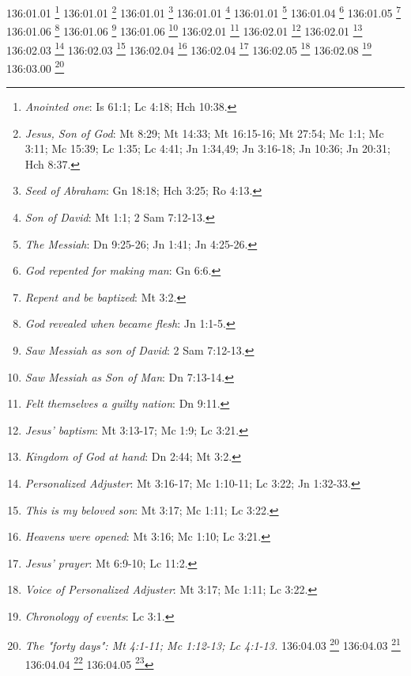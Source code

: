 {{{{{{{{{{{{{{{{{{{{{{{{{{{{{{{136:01.01 \footnote{\textit{Anointed one}: Is 61:1; Lc 4:18; Hch 10:38.}
136:01.01 \footnote{\textit{Jesus, Son of God}: Mt 8:29; Mt 14:33; Mt 16:15-16; Mt 27:54; Mc 1:1; Mc 3:11; Mc 15:39; Lc 1:35; Lc 4:41; Jn 1:34,49; Jn 3:16-18; Jn 10:36; Jn 20:31; Hch 8:37.}
136:01.01 \footnote{\textit{Seed of Abraham}: Gn 18:18; Hch 3:25; Ro 4:13.}
136:01.01 \footnote{\textit{Son of David}: Mt 1:1; 2 Sam 7:12-13.}
136:01.01 \footnote{\textit{The Messiah}: Dn 9:25-26; Jn 1:41; Jn 4:25-26.}
136:01.04 \footnote{\textit{God repented for making man}: Gn 6:6.}
136:01.05 \footnote{\textit{Repent and be baptized}: Mt 3:2.}
136:01.06 \footnote{\textit{God revealed when became flesh}: Jn 1:1-5.}
136:01.06 \footnote{\textit{Saw Messiah as son of David}: 2 Sam 7:12-13.}
136:01.06 \footnote{\textit{Saw Messiah as Son of Man}: Dn 7:13-14.}
136:02.01 \footnote{\textit{Felt themselves a guilty nation}: Dn 9:11.}
136:02.01 \footnote{\textit{Jesus' baptism}: Mt 3:13-17; Mc 1:9; Lc 3:21.}
136:02.01 \footnote{\textit{Kingdom of God at hand}: Dn 2:44; Mt 3:2.}
136:02.03 \footnote{\textit{Personalized Adjuster}: Mt 3:16-17; Mc 1:10-11; Lc 3:22; Jn 1:32-33.}
136:02.03 \footnote{\textit{This is my beloved son}: Mt 3:17; Mc 1:11; Lc 3:22.}
136:02.04 \footnote{\textit{Heavens were opened}: Mt 3:16; Mc 1:10; Lc 3:21.}
136:02.04 \footnote{\textit{Jesus' prayer}: Mt 6:9-10; Lc 11:2.}
136:02.05 \footnote{\textit{Voice of Personalized Adjuster}: Mt 3:17; Mc 1:11; Lc 3:22.}
136:02.08 \footnote{\textit{Chronology of events}: Lc 3:1.}
136:03.00 \footnote{\textit{The "forty days": Mt 4:1-11; Mc 1:12-13; Lc 4:1-13.}
136:04.03 \footnote{\textit{"Temptation" was earlier}: Mt 4:3-11; Mc 1:12-13; Lc 4:13.}
136:04.03 \footnote{\textit{Jesus did not "fast" as such}: Mt 4:2; Mc 1:13; Lc 4:2.}
136:04.04 \footnote{\textit{Not my will but yours be done}: Mt 26:39,42,44; Mc 14:36,39; Lc 22:42; Jn 4:34; Jn 5:30; Jn 6:38-40; Jn 15:10; Jn 17:4.}
136:04.05 \footnote{\textit{Reason for "40 days": Mt 4:1-11; Mc 1:12-13; Lc 4:1-13.}
136:04.08 \footnote{\textit{Decision making}: Mt 4:1; Mc 1:12-13; Lc 4:1-2.}
136:05.01 \footnote{\textit{12 legions of angels & others}: Mt 26:53.}
136:06.01 \footnote{\textit{So-called "temptation" to get food}: Mt 4:3; Lc 4:3.}
136:06.04 \footnote{\textit{Man not live by bread alone}: Dt 8:3; Mt 4:3-4; Lc 4:3-4.}
136:06.05 \footnote{\textit{He saved others, not himself}: Mt 27:42a; Mc 15:31; Lc 23:35a.}
136:06.07 \footnote{\textit{Earth will yield fruits}: Is 4:2; Is 5:10; 1 Hen 10:18-20a.}
136:07.01 \footnote{\textit{So-called "temptation" to jump}: Mt 4:5-6; Lc 4:9-11.}
136:07.02 \footnote{\textit{No evil shall befall you}: Sal 91:10-12.}
}}}}}}}}}}}}}}}}}}}}}}}}}}}}}}}}}
